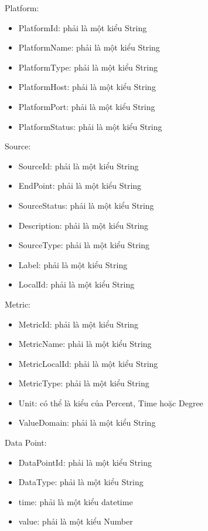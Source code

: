 \hspace{0mm}Platform:
\begin{itemize}
	\item PlatformId: phải là một kiểu String
	\item PlatformName: phải là một kiểu String
	\item PlatformType: phải là một kiểu String
	\item PlatformHost: phải là một kiểu String
	\item PlatformPort: phải là một kiểu String
	\item PlatformStatus: phải là một kiểu String
\end{itemize}


\hspace{0mm}Source:
\begin{itemize}
	\item SourceId: phải là một kiểu String
	\item EndPoint: phải là một kiểu String
	\item SourceStatus: phải là một kiểu String
	\item Description: phải là một kiểu String
	\item SourceType: phải là một kiểu String
	\item Label: phải là một kiểu String
	\item LocalId: phải là một kiểu String
\end{itemize}


\hspace{0mm}Metric:
\begin{itemize}
	\item MetricId: phải là một kiểu String
	\item MetricName: phải là một kiểu String
	\item MetricLocalId: phải là một kiểu String
	\item MetricType: phải là một kiểu String
	\item Unit: có thể là kiểu của Percent, Time hoặc Degree
	\item ValueDomain: phải là một kiểu String
\end{itemize}


\hspace{0mm}Data Point:
\begin{itemize}
	\item DataPointId: phải là một kiểu String
	\item DataType: phải là một kiểu String
	\item time: phải là một kiểu datetime
	\item value: phải là một kiểu Number
\end{itemize}


